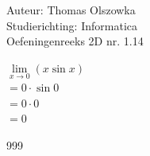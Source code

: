 \documentclass[a4paper]{article}
\begin{document}
\noindent \large Auteur: Thomas Olszowka \\
\noindent \large Studierichting: Informatica \\
\noindent \large Oefeningenreeks 2D nr. 1.14 \\



\medskip

\normalsize

$\lim\limits_{x \rightarrow 0} (x \sin x)$ \\

$= 0 \cdot \sin 0$ \\

$= 0 \cdot 0$ \\

$= 0$ \\

\begin{thebibliography}{999}
\end{thebibliography}
\end{document}
